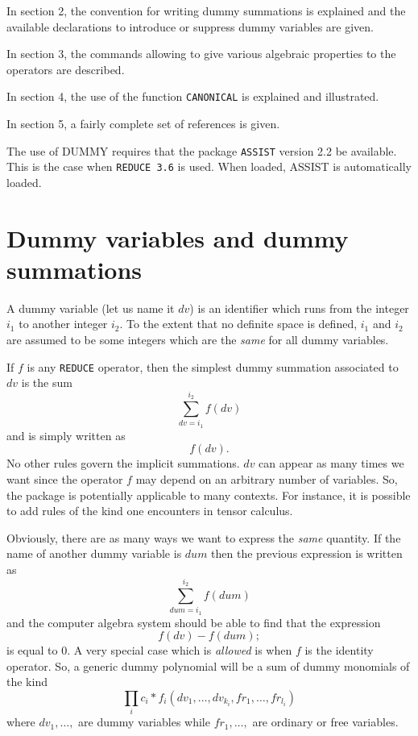 In section 2, the convention for writing dummy summations is explained 
and the available declarations to introduce or suppress dummy variables
are given.

In section 3, the commands allowing to give 
various algebraic properties to the operators are described.

In section 4, the use of the function {\tt CANONICAL} is 
explained and illustrated.

In section 5, a fairly complete set of references is given.

The use of DUMMY requires that the package {\tt ASSIST} 
 version 2.2 be available.
This is the case when {\tt REDUCE 3.6} is used. When loaded, ASSIST is 
automatically loaded.
\section{Dummy variables and dummy summations}
A dummy variable (let us name it $dv$) is an identifier which runs from 
the integer $i_1$ to another integer $i_2$. To the extent that no 
definite space is defined, $i_1$ and $i_2$ are assumed to be some 
integers which are the {\em same} for all dummy variables.

If $f$ is any {\tt REDUCE} operator, then the simplest dummy summation 
associated to $dv$ is the sum  
$$
\sum_{dv=i_1}^{i_2} f(dv)
$$
and is simply written as
$$
f(dv). 
$$
No other rules govern the implicit summations. $dv$ can appear as many times
we want since the operator $f$ may depend on an arbitrary number of 
variables. So, the package is potentially applicable to many contexts.
For instance, it is possible to add rules of the kind one encounters in 
tensor calculus.      

Obviously, there are as many ways we want to express the {\em same} quantity.
If the name of another dummy variable is $dum$ then 
the previous expression is written as
$$
\sum_{dum=i_1}^{i_2} f(dum)
$$
and the computer algebra system should be able to find that the expression
$$
f(dv)-f(dum);
$$
is equal to $0$.
A very special case which is {\em allowed} is when $f$ is the identity 
operator.
So, a generic dummy polynomial will be a sum 
of dummy monomials of the  kind
$$
\prod_i c_i*f_i(dv_1,\ldots ,dv_{k_i},fr_1,\ldots , fr_{l_i})
$$
where $dv_1,\ldots,$ are dummy variables while $fr_1, \ldots, $ 
are ordinary or free variables. 
  
